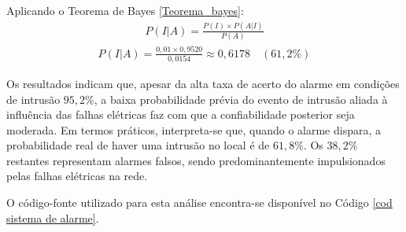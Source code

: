 Aplicando o Teorema de Bayes \ref{Teorema_bayes}:
\begin{align*}
	P(I|A) = \frac{P(I) \times P(A|I)}{P(A)}
\end{align*}
\begin{align*}
	P(I|A) = \frac{0{,}01 \times 0{,}9520}{0{,}0154} \approx 0{,}6178 \quad (61{,}2\%)
\end{align*}


Os resultados indicam que, apesar da alta taxa de acerto do alarme em condições de intrusão $95{,}2\%$, a baixa probabilidade prévia do evento de intrusão aliada à influência das falhas elétricas faz com que a confiabilidade posterior seja moderada. Em termos práticos, interpreta-se que, quando o alarme dispara, a probabilidade real de haver uma intrusão no local é de $61{,}8\%$. Os $38{,}2\%$ restantes representam alarmes falsos, sendo predominantemente impulsionados pelas falhas elétricas na rede.


O código-fonte utilizado para esta análise encontra-se disponível no Código \ref{cod sistema de alarme}.

